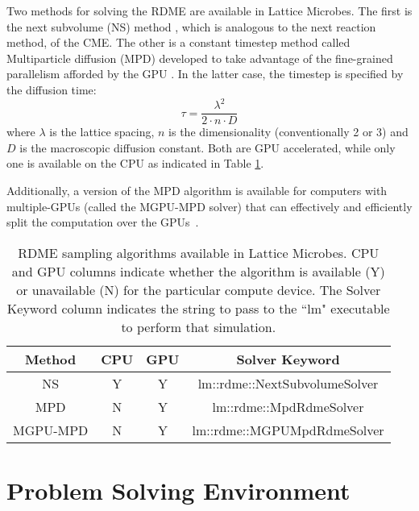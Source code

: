 Two methods for solving the RDME are available in Lattice Microbes.  The first is the next subvolume (NS) method \cite{Elf2004ssb}, which is analogous to the next reaction method, of the CME.  The other is a constant timestep method called Multiparticle diffusion (MPD) developed to take advantage of the fine-grained parallelism afforded by the GPU \cite{Roberts2013lmh}.  In the latter case, the timestep is specified by the diffusion time:
\begin{equation*}
\tau=\frac{\lambda^2}{2\cdot n\cdot D}
\end{equation*}
\noindent where $\lambda$ is the lattice spacing, $n$ is the dimensionality (conventionally 2 or 3) and $D$ is the macroscopic diffusion constant. Both are GPU accelerated, while only one is available on the CPU as indicated in Table \ref{tbl:cmeAlgorithms}.

Additionally, a version of the MPD algorithm is available for computers with multiple-GPUs (called the MGPU-MPD solver) that can effectively and efficiently split the computation over the GPUs~\cite{Hallock2014sor}. 



\begin{table}[htp]
\begin{center}
\begin{tabular}{|c|c|c|c|}
\hline
\textbf{Method} & \textbf{CPU} & \textbf{GPU} & \textbf{Solver Keyword} \\
\hline\hline
NS & Y & Y & lm::rdme::NextSubvolumeSolver \\
\hline
MPD &N & Y & lm::rdme::MpdRdmeSolver \\
\hline
MGPU-MPD & N & Y & lm::rdme::MGPUMpdRdmeSolver \\
\hline
\end{tabular}
\end{center}
\caption{RDME sampling algorithms available in Lattice Microbes.  CPU and GPU columns indicate whether the algorithm is available (Y) or unavailable (N) for the particular compute device.  The Solver Keyword column indicates the string to pass to the ``lm" executable to perform that simulation.} \label{tbl:cmeAlgorithms}
\end{table}%


\section{Problem Solving Environment}

